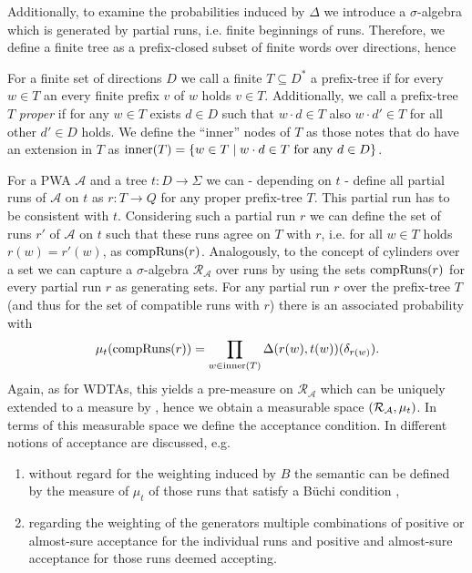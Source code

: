 Additionally, to examine the probabilities induced by $\Delta$ we introduce a
$\sigma$-algebra which is generated by partial runs, i.e. finite beginnings of
runs. Therefore, we define a finite tree as a prefix-closed subset of finite
words over directions, hence
\begin{definition}
  For a finite set of directions $D$ we call a finite $T\subseteq D^{*}$ a
  prefix-tree if for every $w\in T$ an every finite prefix $v$ of $w$ holds
  $v\in T$. Additionally, we call a prefix-tree $T$ \emph{proper} if for any
  $w\in T$ exists $d\in D$ such that $w\cdot d\in T$ also $w\cdot d'\in T$ for
  all other $d'\in D$ holds. We define the \enquote{inner} nodes of $T$ as
  those notes that do have an extension in $T$ as
  $\operatorname{inner}(T) = \left\{w\in T\mid w\cdot d\in T\text{ for any }d\in D\right\}$.
\end{definition}
For a \ac{PWA} $\mathcal{A}$ and a tree $t:D\rightarrow\Sigma$ 
we can - depending on $t$ - define all partial runs of $\mathcal{A}$ on $t$ as
$r:T\rightarrow Q$ for any proper prefix-tree $T$. This partial run has to be
consistent with $t$. Considering such a partial run $r$ we can define the set
of runs $r'$ of $\mathcal{A}$ on $t$ such that these runs agree on $T$ with
$r$, i.e. for all $w\in T$ holds $r(w) = r'(w)$, as $\operatorname{compRuns}(r)$.
Analogously, to the concept of cylinders over a set we can capture a
$\sigma$-algebra $\mathcal{R}_{\mathcal{A}}$ over runs by using the sets
$\operatorname{compRuns}(r)$ for every partial run $r$ as generating sets. For any partial
run $r$ over the prefix-tree $T$ (and thus for the set of compatible runs with
$r$) there is an associated probability with
\begin{equation*}
  \mu_{t}(\operatorname{compRuns}(r)) = \prod\limits_{w\in\operatorname{inner}(T)}
  \Delta(r(w),t(w))(\delta_{r(w)}).
\end{equation*}
Again, as for \acp{WDTA}, this yields a pre-measure on
$\mathcal{R}_{\mathcal{A}}$ which can be uniquely extended to a measure by
\cite[Theorem 5.4]{Bauer}, hence we obtain a measurable space
$\left(\mathcal{R}_{\mathcal{A}}, \mu_{t}\right)$. In terms of this measurable space
we define the acceptance condition. In \cite{RandAutoInfTrees} different
notions of acceptance are discussed, e.g.
\begin{enumerate}
  \item without regard for the weighting induced by $B$ the semantic can be
    defined by the measure of $\mu_{t}$ of those runs that satisfy a Büchi
    condition \cite[analogously to Proposition 38]{RandAutoInfTrees},
  \item regarding the weighting of the generators multiple combinations of
    positive or almost-sure acceptance for the individual runs and positive and
    almost-sure acceptance for those runs deemed accepting.
\end{enumerate}
